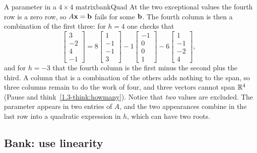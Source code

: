 \documentclass[11pt]{article}
\begin{document}
\begin{exmp}{A parameter in a $4\times4$ matrix}{bankQuad}
At the two exceptional values the fourth row is a zero row, so $A\mathbf{x}=\mathbf{b}$ fails for some $\mathbf{b}$. The fourth column is then a combination of the first three: for $h=4$ one checks that
\[
\begin{bmatrix}3\\-2\\4\\-1\end{bmatrix}=8\begin{bmatrix}1\\-1\\-1\\3\end{bmatrix}-1\begin{bmatrix}-1\\0\\0\\1\end{bmatrix}-6\begin{bmatrix}1\\-1\\-2\\4\end{bmatrix},
\]
and for $h=-3$ that the fourth column is the first minus the second plus the third. A column that is a combination of the others adds nothing to the span, so three columns remain to do the work of four, and three vectors cannot span $\mathbb{R}^4$ (Pause and think~\ref{1.3-think:howmany}). Notice that \emph{two} values are excluded. The parameter appears in two entries of $A$, and the two appearances combine in the last row into a quadratic expression in $h$, which can have two roots.
\end{exmp}

\subsection*{Bank: use linearity}
\end{document}
